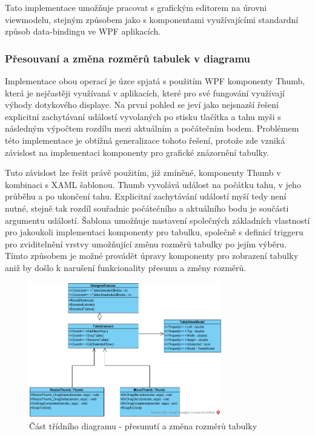 \documentclass[czech,bachelor,public,dept460,male,oneside]{diploma}
\begin{document}
		Tato implementace umožňuje pracovat s grafickým editorem na úrovni viewmodelu, stejným způsobem jako s komponentami využívajícími standardní způsob data-bindingu ve WPF aplikacích. 
		
		\subsubsection{Přesouvaní a změna rozměrů tabulek v diagramu}
		Implementace obou operací je úzce spjatá s použitím WPF komponenty Thumb, která je nejčastěji využívaná v aplikacích, které pro své fungování využívají výhody dotykového displaye. Na první pohled se jeví jako nejsnazší řešení explicitní zachytávaní událostí vyvolaných po stisku tlačítka a tahu myši s následným výpočtem rozdílu mezi aktuálním a počátečním bodem. Problémem této implementace je obtížná generalizace tohoto řešení, protože zde vzniká závislost na implementaci komponenty pro grafické znázornění tabulky. 
		
		Tuto závislost lze řešit právě použitím, již zmíněné, komponenty Thumb v kombinaci s XAML šablonou. Thumb vyvolává událost na počátku tahu, v jeho průběhu a po ukončení tahu. Explicitní zachytávání událostí myší tedy není nutné, stejně tak rozdíl souřadnic počátečního a aktuálního bodu je součásti argumentu událostí. Šablona umožňuje nastavení společných základních vlastností pro jakoukoli implementaci komponenty pro tabulku, společně s definicí triggeru pro zviditelnění vrstvy umožňující změnu rozměrů tabulky po jejím výběru. Tímto způsobem je možné provádět úpravy komponenty pro zobrazení tabulky aniž by došlo k narušení funkcionality přesunu a změny rozměrů. 
		
		\begin{figure}[!h]
			\centering
			\includegraphics[width=0.75\textwidth]{Figures/EditorTabulky}
			\caption{Část třídního diagramu - přesunutí a změna rozměrů tabulky}
			\label{fig:classDiagResize}
		\end{figure}
		
\end{document}
